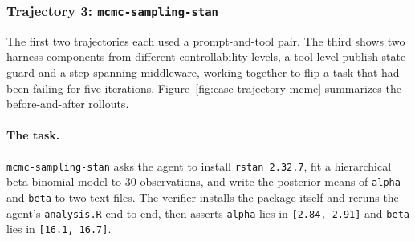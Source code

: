 \subsubsection{Trajectory 3: \texttt{mcmc-sampling-stan}}
\label{app:case-study:mcmc}

The first two trajectories each used a prompt-and-tool pair. The third shows two harness components from different controllability levels, a tool-level publish-state guard and a step-spanning middleware, working together to flip a task that had been failing for five iterations. Figure~\ref{fig:case-trajectory-mcmc} summarizes the before-and-after rollouts.

\paragraph{The task.}
\texttt{mcmc-sampling-stan} asks the agent to install \texttt{rstan 2.32.7}, fit a hierarchical beta-binomial model to 30 observations, and write the posterior means of \texttt{alpha} and \texttt{beta} to two text files. The verifier installs the package itself and reruns the agent's \texttt{analysis.R} end-to-end, then asserts \texttt{alpha} lies in \texttt{[2.84, 2.91]} and \texttt{beta} lies in \texttt{[16.1, 16.7]}.

